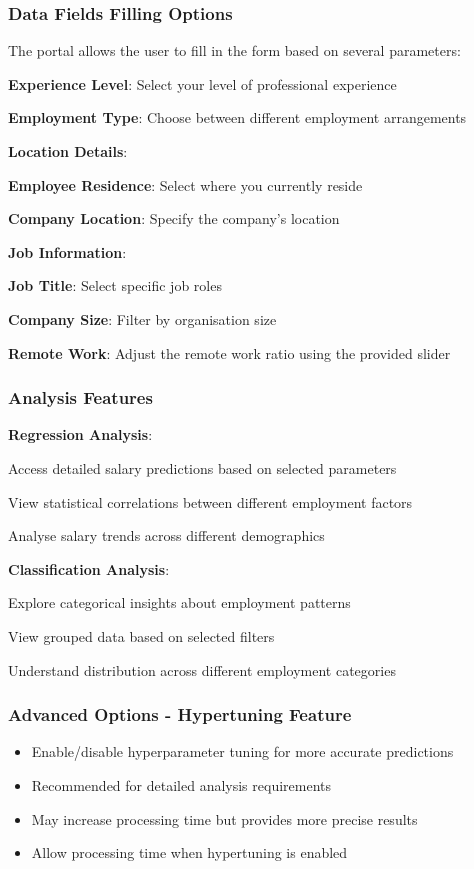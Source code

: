 \documentclass[11pt,a4paper]{article}
\newcommand{\SubItem}[1]{
  {\setlength\itemindent{13pt} \item[◦] #1}
}
\begin{document}
\subsubsection{Data Fields Filling Options}
The portal allows the user to fill in the form based on several parameters:
\begin{itemize}
\item \textbf{Experience Level}: Select your level of professional experience
\item \textbf{Employment Type}: Choose between different employment arrangements
\item \textbf{Location Details}: 
\SubItem{\textbf{Employee Residence}: Select where you currently reside}
\SubItem{\textbf{Company Location}: Specify the company's location}
\item \textbf{Job Information}: 
\SubItem{\textbf{Job Title}: Select specific job roles}
\SubItem{\textbf{Company Size}: Filter by organisation size}
\item \textbf{Remote Work}: Adjust the remote work ratio using the provided slider
\end{itemize}

\subsubsection{Analysis Features}
\begin{itemize}
\item \textbf{Regression Analysis}: 
\SubItem{Access detailed salary predictions based on selected parameters}
\SubItem{View statistical correlations between different employment factors}
\SubItem{Analyse salary trends across different demographics}
\item \textbf{Classification Analysis}: 
\SubItem{Explore categorical insights about employment patterns}
\SubItem{View grouped data based on selected filters}
\SubItem{Understand distribution across different employment categories}
\end{itemize}

\subsubsection{Advanced Options - Hypertuning Feature}
\begin{itemize}
\item Enable/disable hyperparameter tuning for more accurate predictions
\item Recommended for detailed analysis requirements
\item May increase processing time but provides more precise results
\item Allow processing time when hypertuning is enabled
\end{itemize}
\end{document}
